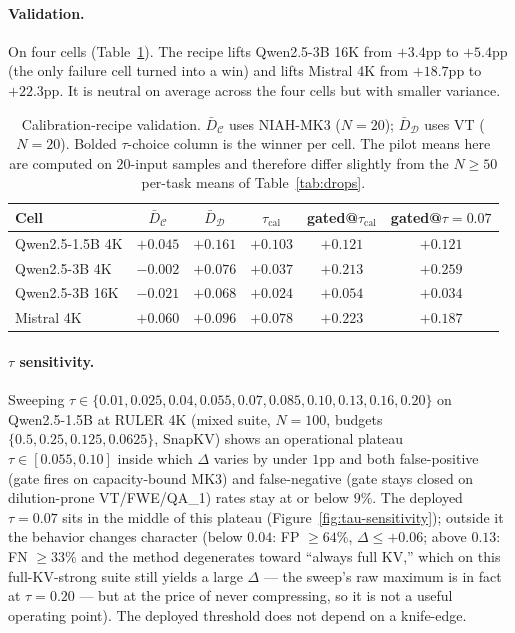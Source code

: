 \documentclass{article} %
\begin{document}
\paragraph{Validation.} On four cells (Table~\ref{tab:recipe}). The recipe
lifts Qwen2.5-3B 16K from $+3.4$pp to $+5.4$pp (the only failure cell turned
into a win) and lifts Mistral 4K from $+18.7$pp to $+22.3$pp. It is
neutral on average across the four cells but with smaller variance.

\begin{table}[t]
\centering
\caption{Calibration-recipe validation. $\bar D_{\mathcal C}$ uses NIAH-MK3
($N = 20$); $\bar D_{\mathcal D}$ uses VT ($N = 20$).
Bolded $\tau$-choice column is the winner per cell. The pilot means here
are computed on $20$-input samples and therefore differ slightly from the
$N \ge 50$ per-task means of Table~\ref{tab:drops}.}
\label{tab:recipe}
\begin{tabular}{lccccc}
\toprule
Cell & $\bar D_{\mathcal C}$ & $\bar D_{\mathcal D}$ & $\tau_{\mathrm{cal}}$
& gated@$\tau_{\mathrm{cal}}$ & gated@$\tau\!=\!0.07$ \\
\midrule
Qwen2.5-1.5B 4K & $+0.045$ & $+0.161$ & $+0.103$ & $+0.121$ & $+0.121$ \\
Qwen2.5-3B 4K   & $-0.002$ & $+0.076$ & $+0.037$ & $+0.213$ & $\boldsymbol{+0.259}$ \\
Qwen2.5-3B 16K  & $-0.021$ & $+0.068$ & $+0.024$ & $\boldsymbol{+0.054}$ & $+0.034$ \\
Mistral 4K       & $+0.060$ & $+0.096$ & $+0.078$ & $\boldsymbol{+0.223}$ & $+0.187$ \\
\bottomrule
\end{tabular}
\end{table}

\paragraph{$\tau$ sensitivity.} Sweeping $\tau \in \{0.01, 0.025,
0.04, 0.055, 0.07, 0.085, 0.10, 0.13, 0.16, 0.20\}$ on Qwen2.5-1.5B at
RULER 4K (mixed suite, $N=100$, budgets $\{0.5, 0.25, 0.125, 0.0625\}$,
SnapKV) shows an operational plateau $\tau \in [0.055, 0.10]$ inside
which $\Delta$ varies by under $1$pp and both false-positive (gate
fires on capacity-bound MK3) and false-negative (gate stays closed on
dilution-prone VT/FWE/QA\_1) rates stay at or below $9\%$. The deployed
$\tau = 0.07$ sits in the middle of this plateau
(Figure~\ref{fig:tau-sensitivity}); outside it the behavior changes
character (below $0.04$: FP $\geq 64\%$, $\Delta \leq +0.06$; above
$0.13$: FN $\geq 33\%$ and the method degenerates toward ``always full
KV,'' which on this full-KV-strong suite still yields a large $\Delta$
--- the sweep's raw maximum is in fact at $\tau = 0.20$ --- but at the
price of never compressing, so it is not a useful operating point). The
deployed threshold does not depend on a knife-edge.
\end{document}
